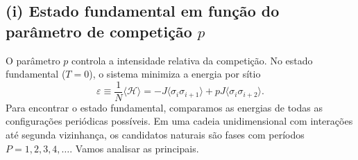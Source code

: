 \documentclass[11pt,a4paper]{article}
\begin{document}
\subsection*{(i) Estado fundamental em função do parâmetro de competição $p$}
%
O parâmetro \(p\) controla a intensidade relativa da competição.
%
No estado fundamental (\(T=0\)), o sistema minimiza a energia por sítio
%
\begin{equation}
    \varepsilon \equiv \frac{1}{N} \langle \mathcal H \rangle
    = -J \langle \sigma_i \sigma_{i+1} \rangle + pJ \langle \sigma_i \sigma_{i+2} \rangle.
\end{equation}
%
Para encontrar o estado fundamental, comparamos as energias de todas as configurações periódicas possíveis. Em uma cadeia unidimensional com interações até segunda vizinhança, os candidatos naturais são fases com períodos \(P = 1, 2, 3, 4, \dots\). Vamos analisar as principais.
%
\end{document}

